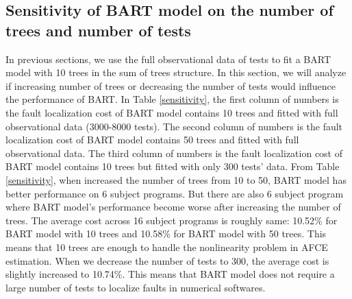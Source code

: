 \subsection{Sensitivity of BART model on the number of trees and number of tests}\label{BARTsensitivity}

In previous sections, we use the full observational data of tests to fit a BART model with 10 trees in the sum of trees structure. In this section, we will analyze if increasing number of trees or decreasing the number of tests would influence the performance of BART. In Table \ref{sensitivity}, the first column of numbers is the fault localization cost of BART model contains 10 trees and fitted with full observational data (3000-8000 tests). The second column of numbers is the fault localization cost of BART model contains 50 trees and fitted with full observational data. The third column of numbers is the fault localization cost of BART model contains 10 trees but fitted with only 300 tests' data. From Table \ref{sensitivity}, when increased the number of trees from 10 to 50, BART model has better performance on 6 subject programs. But there are also 6 subject program where BART model's performance become worse after increasing the number of trees. The average cost across 16 subject programs is roughly same: 10.52\% for BART model with 10 trees and 10.58\% for BART model with 50 trees. This means that 10 trees are enough to handle the nonlinearity problem in AFCE estimation.  When we decrease the number of tests to 300, the average cost is slightly increased to 10.74\%.  This means that BART model does not require a large number of tests to localize faults in numerical softwares.

